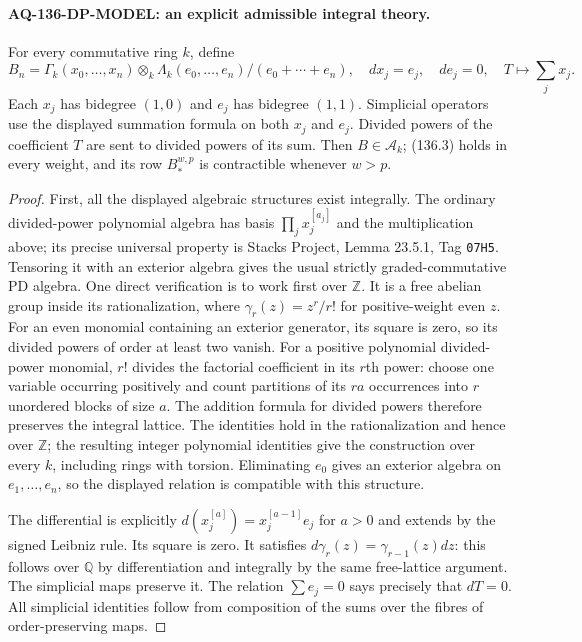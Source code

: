 \paragraph{AQ-136-DP-MODEL: an explicit admissible integral theory.}
For every commutative ring $k$, define
\[
 B_n=\Gamma_k(x_0,\ldots,x_n)
       \otimes_k\Lambda_k(e_0,\ldots,e_n)/(e_0+\cdots+e_n),
 \quad dx_j=e_j,\quad de_j=0,\quad T\mapsto\sum_jx_j .        \tag{136.5}
\]
Each $x_j$ has bidegree $(1,0)$ and $e_j$ has bidegree
$(1,1)$.  Simplicial operators use the displayed summation
formula on both $x_j$ and $e_j$.  Divided powers of the
coefficient $T$ are sent to divided powers of its sum.
Then $B\in\mathcal A_k$; (136.3) holds in every weight,
and its row $B^{w,p}_*$ is contractible whenever $w>p$.

\begin{proof}
First, all the displayed algebraic structures exist integrally.
The ordinary divided-power polynomial algebra has basis
$\prod_jx_j^{[a_j]}$ and the multiplication above; its precise
universal property is Stacks Project, Lemma 23.5.1,
Tag \texttt{07H5}.  Tensoring it with an exterior algebra
gives the usual strictly graded-commutative PD algebra.
One direct verification is to work first over $\mathbb Z$.
It is a free abelian group inside its rationalization, where
$\gamma_r(z)=z^r/r!$ for positive-weight even $z$.
For an even monomial containing an exterior generator, its
square is zero, so its divided powers of order at least two
vanish.  For a positive polynomial divided-power monomial,
$r!$ divides the factorial coefficient in its $r$th power:
choose one variable occurring positively and count partitions
of its $ra$ occurrences into $r$ unordered blocks of size $a$.
The addition formula for divided powers therefore preserves
the integral lattice.  The identities hold in the
rationalization and hence over $\mathbb Z$; the resulting
integer polynomial identities give the construction over every
$k$, including rings with torsion.  Eliminating $e_0$ gives
an exterior algebra on $e_1,\ldots,e_n$, so the displayed
relation is compatible with this structure.

The differential is explicitly
$d(x_j^{[a]})=x_j^{[a-1]}e_j$ for $a>0$ and extends by the
signed Leibniz rule.  Its square is zero.  It satisfies
$d\gamma_r(z)=\gamma_{r-1}(z)dz$: this follows over
$\mathbb Q$ by differentiation and integrally by the same
free-lattice argument.  The simplicial maps preserve it.
The relation $\sum e_j=0$ says precisely that $dT=0$.
All simplicial identities follow from composition of the
sums over the fibres of order-preserving maps.


\end{proof}
